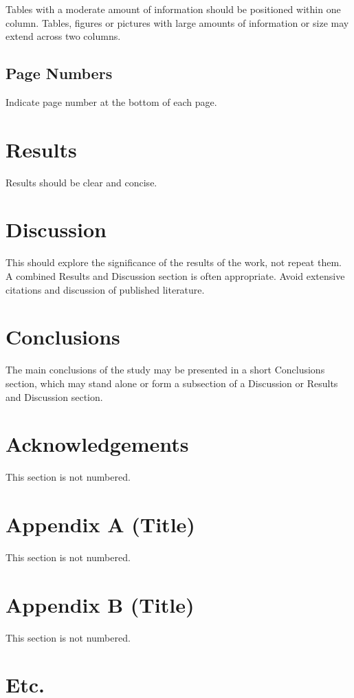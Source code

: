 \documentclass[twocolumn, 10pt]{article}
\begin{document}
Tables with a moderate amount of information should be positioned within one column. Tables, figures or pictures with large amounts of information or size may extend across two columns.

\subsection{Page Numbers}
Indicate page number at the bottom of each page.

\section{Results}
Results should be clear and concise.

\section{Discussion}
This should explore the significance of the results of the work, not repeat them. A combined Results and Discussion section is often appropriate. Avoid extensive citations and discussion of published literature.

\section{Conclusions}
The main conclusions of the study may be presented in a short Conclusions section, which may stand alone or form a subsection of a Discussion or Results and Discussion section.

\section*{Acknowledgements}
This section is not numbered.

\setcounter{equation}{0}
\renewcommand\theequation{A.\arabic{equation}}

\section*{Appendix A (Title)}
This section is not numbered.

\section*{Appendix B (Title)}
This section is not numbered.

\section*{Etc.}
\end{document}
